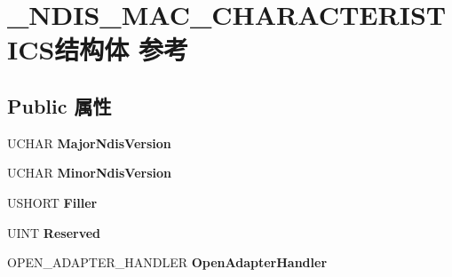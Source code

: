 \hypertarget{struct___n_d_i_s___m_a_c___c_h_a_r_a_c_t_e_r_i_s_t_i_c_s}{}\section{\+\_\+\+N\+D\+I\+S\+\_\+\+M\+A\+C\+\_\+\+C\+H\+A\+R\+A\+C\+T\+E\+R\+I\+S\+T\+I\+C\+S结构体 参考}
\label{struct___n_d_i_s___m_a_c___c_h_a_r_a_c_t_e_r_i_s_t_i_c_s}
\subsection*{Public 属性}
\begin{DoxyCompactItemize}
\item 
\mbox{\label{struct___n_d_i_s___m_a_c___c_h_a_r_a_c_t_e_r_i_s_t_i_c_s_a43db6082985dcd1b4a667eda73e85e39}} 
U\+C\+H\+AR {\bfseries Major\+Ndis\+Version}
\item 
\mbox{\label{struct___n_d_i_s___m_a_c___c_h_a_r_a_c_t_e_r_i_s_t_i_c_s_aff5eabde608cba8f928ae01d950284f6}} 
U\+C\+H\+AR {\bfseries Minor\+Ndis\+Version}
\item 
\mbox{\label{struct___n_d_i_s___m_a_c___c_h_a_r_a_c_t_e_r_i_s_t_i_c_s_a8a8fda2797b4533cf4972c88584c8d15}} 
U\+S\+H\+O\+RT {\bfseries Filler}
\item 
\mbox{\label{struct___n_d_i_s___m_a_c___c_h_a_r_a_c_t_e_r_i_s_t_i_c_s_aa490273783c8f9ef388e11b7d24efcce}} 
U\+I\+NT {\bfseries Reserved}
\item 
\mbox{\label{struct___n_d_i_s___m_a_c___c_h_a_r_a_c_t_e_r_i_s_t_i_c_s_a2f6f69babeb38a49ed41cb79c32c4bca}} 
O\+P\+E\+N\+\_\+\+A\+D\+A\+P\+T\+E\+R\+\_\+\+H\+A\+N\+D\+L\+ER {\bfseries Open\+Adapter\+Handler}
\item 
\mbox{\label{struct___n_d_i_s___m_a_c___c_h_a_r_a_c_t_e_r_i_s_t_i_c_s_af5507898dc39ef39350fdb331d4bcefc}} 

\end{DoxyCompactItemize}
